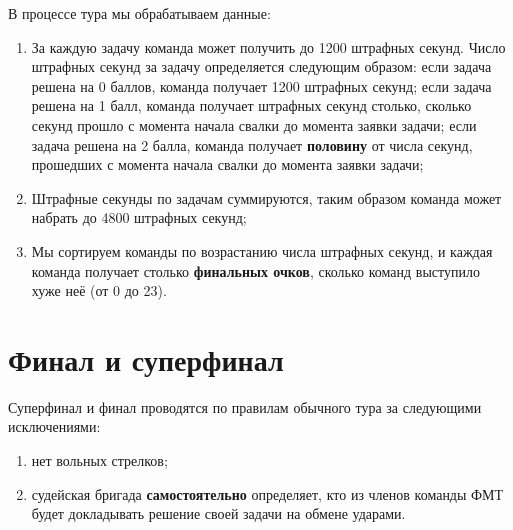 \documentclass[12pt,a4paper]{article}
\begin{document}
В процессе тура мы обрабатываем данные:
\begin{enumerate}
	\item За каждую задачу команда может получить до 1200 штрафных секунд. Число штрафных секунд за задачу определяется следующим образом: если задача решена на 0 баллов, команда получает 1200 штрафных секунд; если задача решена на 1 балл, команда получает штрафных секунд столько, сколько секунд прошло с момента начала свалки до момента заявки задачи; если задача решена на 2 балла, команда получает {\bf половину} от числа секунд, прошедших с момента начала свалки до момента заявки задачи;
	\item Штрафные секунды по задачам суммируются, таким образом команда может набрать до 4800 штрафных секунд;
	\item Мы сортируем команды по возрастанию числа штрафных секунд, и каждая команда получает столько {\bf финальных очков}, сколько команд выступило хуже неё (от 0 до 23).
\end{enumerate}


\section{Финал и суперфинал}
Суперфинал и финал проводятся по правилам обычного тура за следующими исключениями:
\begin{enumerate}
\item нет вольных стрелков;
\item судейская бригада {\bf самостоятельно} определяет, кто из членов команды ФМТ будет докладывать решение своей задачи на обмене ударами.
\end{enumerate}

\clearpage
\end{document}
